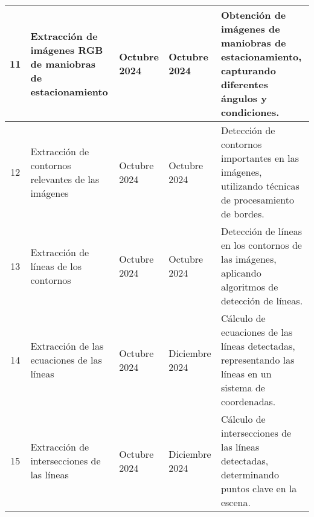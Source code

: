 \begin{center}
\begin{tabularx}{\textwidth}{|c|p{4cm}|p{1cm}|p{1cm}|X|}
        \hline
        11 & Extracción de imágenes RGB de maniobras de estacionamiento & Octubre 2024 & Octubre 2024 & Obtención de imágenes de maniobras de estacionamiento, capturando diferentes ángulos y condiciones. \\
        \hline
        12 & Extracción de contornos relevantes de las imágenes & Octubre 2024 & Octubre 2024 & Detección de contornos importantes en las imágenes, utilizando técnicas de procesamiento de bordes. \\
        \hline
        13 & Extracción de líneas de los contornos & Octubre 2024 & Octubre 2024 & Detección de líneas en los contornos de las imágenes, aplicando algoritmos de detección de líneas. \\
        \hline
        14 & Extracción de las ecuaciones de las líneas & Octubre 2024 & Diciembre 2024 & Cálculo de ecuaciones de las líneas detectadas, representando las líneas en un sistema de coordenadas. \\
        \hline
        15 & Extracción de intersecciones de las líneas & Octubre 2024 & Diciembre 2024 & Cálculo de intersecciones de las líneas detectadas, determinando puntos clave en la escena. \\
        \hline
      \end{tabularx}
    \end{center}
    
